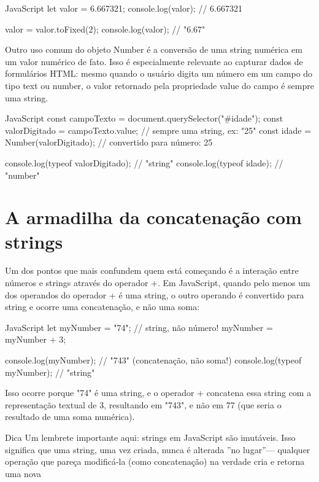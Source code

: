 \begin{codebox}{JavaScript}
let valor = 6.667321;
console.log(valor); // 6.667321

valor = valor.toFixed(2);
console.log(valor); // "6.67"
\end{codebox}

Outro uso comum do objeto Number é a conversão de uma string numérica em um valor numérico de fato. Isso é especialmente relevante ao capturar dados de formulários HTML: mesmo quando o usuário digita um número em um campo do tipo text ou number, o valor retornado pela propriedade value do campo é sempre uma string.

\begin{codebox}{JavaScript}
const campoTexto = document.querySelector("#idade");
const valorDigitado = campoTexto.value;       // sempre uma string, ex: "25"
const idade = Number(valorDigitado);          // convertido para número: 25

console.log(typeof valorDigitado); // "string"
console.log(typeof idade);         // "number"
\end{codebox}

\section{A armadilha da concatenação com strings}

Um dos pontos que mais confundem quem está começando é a interação entre números e strings através do operador +. Em JavaScript, quando pelo menos um dos operandos do operador + é uma string, o outro operando é convertido para string e ocorre uma concatenação, e não uma soma:

\begin{codebox}{JavaScript}
let myNumber = "74"; // string, não número!
myNumber = myNumber + 3;

console.log(myNumber);        // "743" (concatenação, não soma!)
console.log(typeof myNumber); // "string"
\end{codebox}

Isso ocorre porque "74" é uma string, e o operador + concatena essa string com a representação textual de 3, resultando em "743", e não em 77 (que seria o resultado de uma soma numérica).

\begin{infobox}{Dica}
Um lembrete importante aqui: strings em JavaScript são imutáveis. Isso significa que uma string, uma vez criada, nunca é alterada ”no lugar”— qualquer operação que pareça modificá-la (como concatenação) na verdade cria e retorna uma nova
\end{infobox}

